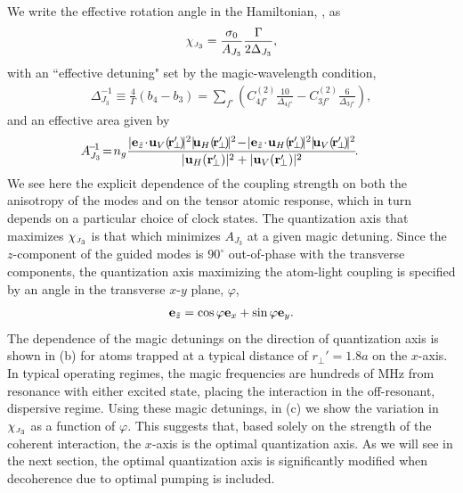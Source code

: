 \documentclass[aps,pra,twocolumn]{revtex4-1} %
\newcommand{\qaxis}{\mathbf{e}_{\tilde{z}}}
\newcommand{\chieff}{\chi_{\raisebox{-.1pt}{\tiny $J_3$}}}
\begin{document}
We write the effective rotation angle in the Hamiltonian, , as
	\begin{align} \label{Eq::chieff}
		\chieff = \frac{\sigma_0}{A_{J_3}} \frac{\Gamma}{ 2 \Delta_{J_3}},
	\end{align}
with an ``effective detuning" set by the magic-wavelength condition,
	\begin{align} \label{Eq::SqueezingEffectiveDetuning}
		 \Delta_{J_3}^{-1} \equiv \frac{4}{\Gamma} (b_4 \!-\! b_3) =\!   \sum_{f'}\!  \left( C^{(2)}_{4f'}\!\frac{10}{\Delta_{4f'}} \!-\!  C^{(2)}_{3f'}\!\frac{6}{ \Delta_{3f'} } \right),
	\end{align}
and an effective area given by
	\begin{align} \label{Eq::SqueezingModeArea}
		\!\!\!\!\!A_{J_3}^{\!-\!1} & \!=\! n_g \frac{ |\mathbf{e}_{\tilde{z}} \!\cdot\! \mathbf{u}_V(\!\br'\!\!_\perp\!)\!|^2 |\!\mathbf{u}_H(\!\br'\!\!_\perp\!)\!|^2 \!-\! |\mathbf{e}_{\tilde{z}} \!\cdot\! \mathbf{u}_H(\!\br'\!\!_\perp\!) \!|^2 |\!\mathbf{u}_V(\!\br'\!\!_\perp\!)\!|^2 }{ |\mathbf{u}_H(\br'\!\!_\perp)|^2 + |\mathbf{u}_V(\br'\!\!_\perp)|^2 } \!.
	\end{align}	
We see here the explicit dependence of the coupling strength on both the anisotropy of the modes and on the tensor atomic response, which in turn depends on a particular choice of clock states.  The quantization axis that maximizes $\chieff$ is that which minimizes $A_{J_3}$ at a given magic detuning.  
Since the $z$-component of the guided modes is $90^\circ$ out-of-phase with the transverse components, the quantization axis maximizing the atom-light coupling is specified by an angle in the transverse $x$-$y$ plane, $\varphi$,
	\begin{align} \label{Eq::QuantizationAxis}
		\qaxis = \cos \varphi \mbf{e}_x + \sin \varphi \mbf{e}_y.
	\end{align}
The dependence of the magic detunings on the direction of quantization axis is shown in (b) for atoms trapped at a typical distance of $r_\perp'=1.8a$ on the $x$-axis.   
In typical operating regimes, the magic frequencies are hundreds of MHz from resonance with either excited state, placing the interaction in the off-resonant, dispersive regime.  
Using these magic detunings, in (c) we show the variation in $\chieff$ as a function of $\varphi$.  
This suggests that, based solely on the strength of the coherent interaction, the $x$-axis is the optimal quantization axis. 
As we will see in the next section, the optimal quantization axis is significantly modified when decoherence due to optimal pumping is included.
\end{document}
